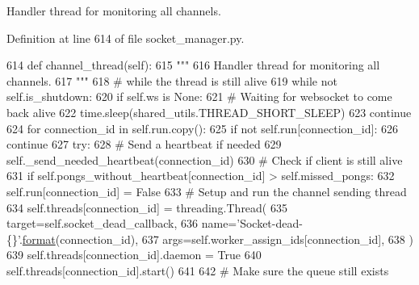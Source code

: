 \begin{DoxyVerb}Handler thread for monitoring all channels.
\end{DoxyVerb}
 

Definition at line 614 of file socket\+\_\+manager.\+py.


\begin{DoxyCode}
614     \textcolor{keyword}{def }channel\_thread(self):
615         \textcolor{stringliteral}{"""}
616 \textcolor{stringliteral}{        Handler thread for monitoring all channels.}
617 \textcolor{stringliteral}{        """}
618         \textcolor{comment}{# while the thread is still alive}
619         \textcolor{keywordflow}{while} \textcolor{keywordflow}{not} self.is\_shutdown:
620             \textcolor{keywordflow}{if} self.ws \textcolor{keywordflow}{is} \textcolor{keywordtype}{None}:
621                 \textcolor{comment}{# Waiting for websocket to come back alive}
622                 time.sleep(shared\_utils.THREAD\_SHORT\_SLEEP)
623                 \textcolor{keywordflow}{continue}
624             \textcolor{keywordflow}{for} connection\_id \textcolor{keywordflow}{in} self.run.copy():
625                 \textcolor{keywordflow}{if} \textcolor{keywordflow}{not} self.run[connection\_id]:
626                     \textcolor{keywordflow}{continue}
627                 \textcolor{keywordflow}{try}:
628                     \textcolor{comment}{# Send a heartbeat if needed}
629                     self.\_send\_needed\_heartbeat(connection\_id)
630                     \textcolor{comment}{# Check if client is still alive}
631                     \textcolor{keywordflow}{if} self.pongs\_without\_heartbeat[connection\_id] > self.missed\_pongs:
632                         self.run[connection\_id] = \textcolor{keyword}{False}
633                         \textcolor{comment}{# Setup and run the channel sending thread}
634                         self.threads[connection\_id] = threading.Thread(
635                             target=self.socket\_dead\_callback,
636                             name=\textcolor{stringliteral}{'Socket-dead-\{\}'}.\hyperlink{namespaceparlai_1_1chat__service_1_1services_1_1messenger_1_1shared__utils_a32e2e2022b824fbaf80c747160b52a76}{format}(connection\_id),
637                             args=self.worker\_assign\_ids[connection\_id],
638                         )
639                         self.threads[connection\_id].daemon = \textcolor{keyword}{True}
640                         self.threads[connection\_id].start()
641 
642                     \textcolor{comment}{# Make sure the queue still exists}

\end{DoxyCode}
